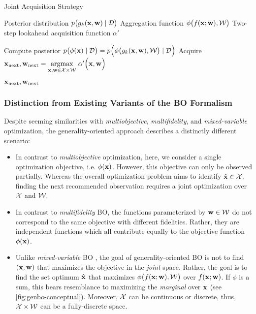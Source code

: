\begin{algorithm}
\caption{Joint Acquisition Strategy}\label{alg:joint_acquisition}
\footnotesize
\begin{algorithmic}[1]
    \Require
    \Statex Posterior distribution  $p\big(g_k ({\mathbf{x}}, {\mathbf{w}}) \mid \mathcal{D}\big)$
    \Statex Aggregation function $\phi\big(f({\mathbf{x}}; {\mathbf{w}}), \mathcal{W}\big)$
    \Statex Two-step lookahead acquisition function $\alpha'$
    
    \vspace{0.2cm}
    
    \State Compute posterior $p\big(\phi ({\mathbf{x}}) \mid \mathcal{D}\big) = p \Big(\phi \big(g_k ({\mathbf{x}}, {\mathbf{w}}), \mathcal{W}\big) \mid \mathcal{D} \Big)$
    \State Acquire ${\mathbf{x}}_{\text{next}}, {\mathbf{w}}_{\text{next}}  = \underset{{\mathbf{x}}, {\mathbf{w}} \in \mathcal{X} \times \mathcal{W}}{\text{argmax}} \ \alpha'\Big({\mathbf{x}},{\mathbf{w}}\Big)$
    \vspace{0.2cm}
    
    \State \Return ${\mathbf{x}}_{\text{next}}, {\mathbf{w}}_{\text{next}}$

\end{algorithmic}
\end{algorithm}

\subsubsection{Distinction from Existing Variants of the BO Formalism} \label{subsubsec:differentiation}

Despite seeming similarities with \textit{multiobjective}, \textit{multifidelity}, and \textit{mixed-variable} optimization, the generality-oriented approach describes a distinctly different scenario:
%
\begin{itemize}
    \itemsep 0.25em
    \item{In contrast to \textit{multiobjective} optimization, here, we consider a single optimization objective, i.e. $\phi({\mathbf{x}})$. However, this objective can only be observed partially. Whereas the overall optimization problem aims to identify $\hat{{\mathbf{x}}} \in {\mathcal{X}}$, finding the next recommended observation requires a joint optimization over ${\mathcal{X}}$ and ${\mathcal{W}}$.}
    \item{In contrast to \textit{multifidelity} BO, the functions parameterized by ${\mathbf{w}} \in {\mathcal{W}}$ do not correspond to the same objective with different fidelities. Rather, they are independent functions which all contribute equally to the objective function $\phi({\mathbf{x}})$.}
    \item Unlike \textit{mixed-variable} BO \citep{daxberger_mixed-variable_2020}, the goal of generality-oriented BO is not to find $({\mathbf{x}}, {\mathbf{w}})$ that maximizes the objective in the \emph{joint} space. 
    Rather, the goal is to find the set optimum $\hat{{\mathbf{x}}}$ that maximizes $\phi\big(f({\mathbf{x}}; {\mathbf{w}}), {\mathcal{W}}\big)$ over $f({\mathbf{x}}; {\mathbf{w}})$. 
    If $\phi$ is a sum, this bears resemblance to maximizing the \emph{marginal} over ${\mathbf{x}}$ (see \cref{fig:genbo-conceptual}). 
    Moreover, ${\mathcal{X}}$ can be continuous or discrete, thus, \({\mathcal{X}} \times {\mathcal{W}}\) can be a fully-discrete space.
\end{itemize}

